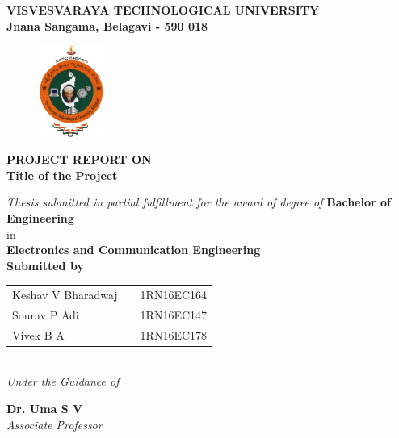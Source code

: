
\begin{titlingpage}
\thispagestyle{empty}\centering

\setlength{\toptafiddle}{1in}
\setlength{\bottafiddle}{1in}
\vspace*{-1.25in}
\enlargethispage{\toptafiddle}
\large 
\textbf{VISVESVARAYA TECHNOLOGICAL UNIVERSITY\\
	Jnana Sangama, Belagavi - 590 018}\\
\vspace{0.2cm}
\begin{figure}[h]
\centering
\includegraphics[height=3cm]{images/vtu.png}
\end{figure}
{\textbf{PROJECT REPORT ON}}\\

\Huge{\textbf{\color{red}Title of the Project}}
\vspace{0.5cm}

\large \textit{Thesis submitted in partial fulfillment for the award of degree of }{\textbf{Bachelor of Engineering}}\\
in \\\textbf{Electronics and Communication Engineering}
\vspace{0.5cm}\\
{\textbf{Submitted by}}


\begin{tabular}{lll}

Keshav V Bharadwaj & \hspace{5cm}  &1RN16EC164\\
Sourav P Adi &   &1RN16EC147\\
Vivek B A &   &1RN16EC178\\


\end{tabular}
\vspace{0.5cm}\\
\textit{Under the Guidance of}


\Large{\textbf{Dr. Uma S V}}\\
\textit{Associate Professor}\\


\end{titlingpage}
